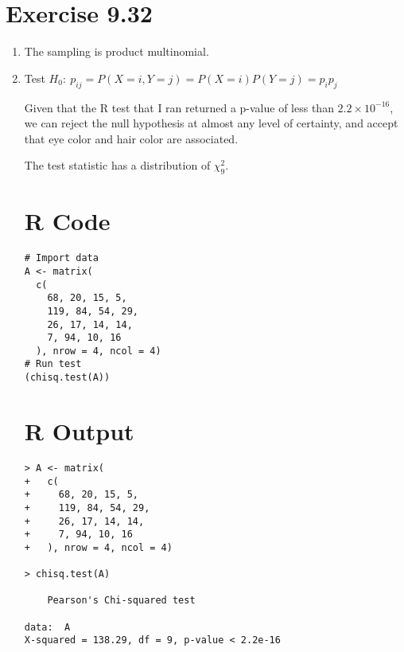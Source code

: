 \documentclass{article}
\begin{document}
\section*{Exercise 9.32}

\begin{enumerate}[\quad(a)]
	\item The sampling is product multinomial.
	\item Test $H_0:\ p_{ij} = P(X = i, Y = j) = P(X = i) P(Y = j) = p_ip_j$

	Given that the R test that I ran returned a p-value of less than $2.2\times 10^{-16}$, we can reject the null hypothesis at almost any level of certainty, and accept that eye color and hair color are associated.

	The test statistic has a distribution of $\chi^2_{9}$.
\section*{R Code}
\begin{verbatim}
# Import data
A <- matrix(
  c(
    68, 20, 15, 5, 
    119, 84, 54, 29, 
    26, 17, 14, 14, 
    7, 94, 10, 16
  ), nrow = 4, ncol = 4)
# Run test
(chisq.test(A))
\end{verbatim}

\section*{R Output}
\begin{verbatim}
> A <- matrix(
+   c(
+     68, 20, 15, 5, 
+     119, 84, 54, 29, 
+     26, 17, 14, 14, 
+     7, 94, 10, 16
+   ), nrow = 4, ncol = 4)

> chisq.test(A)

	Pearson's Chi-squared test

data:  A
X-squared = 138.29, df = 9, p-value < 2.2e-16
\end{verbatim}
\end{enumerate}
\end{document}
